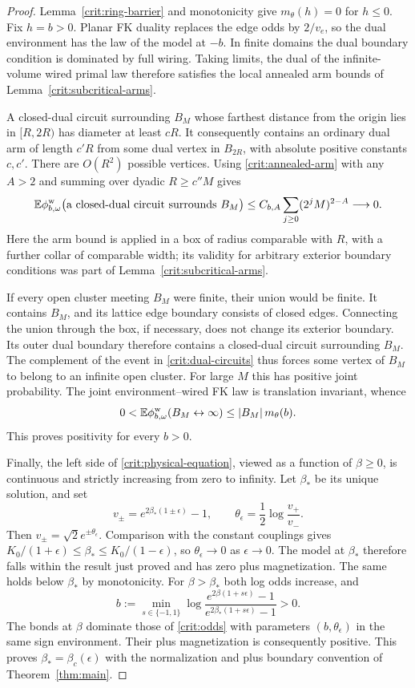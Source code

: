 \begin{proof}
Lemma~\ref{crit:ring-barrier} and monotonicity give $m_\theta(h)=0$
for $h\le0$. Fix $h=b>0$. Planar FK duality replaces the edge odds
by $2/v_e$, so the dual environment has the law of the model at $-b$.
In finite domains the dual boundary condition is dominated by full
wiring. Taking limits, the dual of the infinite-volume wired primal
law therefore satisfies the local annealed arm bounds of
Lemma~\ref{crit:subcritical-arms}.

A closed-dual circuit surrounding $B_M$ whose farthest distance from
the origin lies in $[R,2R)$ has diameter at least $cR$. It consequently
contains an ordinary dual arm of length $c'R$ from some dual vertex
in $B_{2R}$, with absolute positive constants $c,c'$. There are
$O(R^2)$ possible vertices. Using \eqref{crit:annealed-arm} with any
$A>2$ and summing over dyadic $R\ge c''M$ gives
\begin{equation}
 \mathbb E\phi_{b,\omega}^{\mathrm w}
 \bigl(\text{a closed-dual circuit surrounds }B_M\bigr)
 \le C_{b,A}\sum_{j\ge0}(2^jM)^{2-A}
 \longrightarrow0.
 \label{crit:dual-circuits}
\end{equation}
Here the arm bound is applied in a box of radius comparable with
$R$, with a further collar of comparable width; its validity for
arbitrary exterior boundary conditions was part of
Lemma~\ref{crit:subcritical-arms}.

If every open cluster meeting $B_M$ were finite, their union would
be finite. It contains $B_M$, and its lattice edge boundary consists
of closed edges. Connecting the union through the box, if necessary,
does not change its exterior boundary. Its outer dual boundary
therefore contains a closed-dual circuit surrounding $B_M$.
The complement of the event in \eqref{crit:dual-circuits} thus forces
some vertex of $B_M$ to belong to an infinite open cluster. For large
$M$ this has positive joint probability. The joint environment--wired
FK law is translation invariant, whence
\[
 0<\mathbb E\phi_{b,\omega}^{\mathrm w}(B_M\leftrightarrow\infty)
 \le |B_M|\,m_\theta(b).
\]
This proves positivity for every $b>0$.

Finally, the left side of \eqref{crit:physical-equation}, viewed as
a function of $\beta\ge0$, is continuous and strictly increasing
from zero to infinity. Let $\beta_*$ be its unique solution, and set
\[
 v_\pm=e^{2\beta_*(1\pm\epsilon)}-1,
 \qquad
 \theta_\epsilon=\frac12\log\frac{v_+}{v_-}.
\]
Then $v_\pm=\sqrt2e^{\pm\theta_\epsilon}$. Comparison with the
constant couplings gives
$K_0/(1+\epsilon)\le\beta_*\le K_0/(1-\epsilon)$, so
$\theta_\epsilon\to0$ as $\epsilon\to0$. The model at $\beta_*$
therefore falls within the result just proved and has zero plus
magnetization. The same holds below $\beta_*$ by monotonicity.
For $\beta>\beta_*$ both log odds increase, and
\[
 b:=\min_{s\in\{-1,1\}}
       \log\frac{e^{2\beta(1+s\epsilon)}-1}
                    {e^{2\beta_*(1+s\epsilon)}-1}>0.
\]
The bonds at $\beta$ dominate those of
\eqref{crit:odds} with parameters $(b,\theta_\epsilon)$ in the
same sign environment. Their plus magnetization is consequently
positive. This proves $\beta_*=\beta_c(\epsilon)$ with the
normalization and plus boundary convention of Theorem~\ref{thm:main}.
\end{proof}

